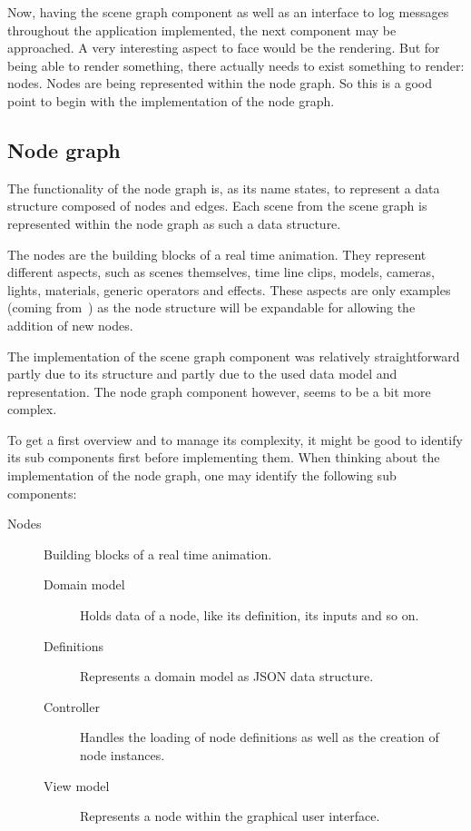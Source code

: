 \documentclass[
    a4paper,      %
    10pt,         %
    openright,    %
    notitlepage,  %
    parskip=half, %
]{scrreprt}       %
\theoremstyle{definition}                    %
\begin{document}
Now, having the scene graph component as well as an interface to log messages
throughout the application implemented, the next component may be approached. A
very interesting aspect to face would be the rendering. But for being able to
render something, there actually needs to exist something to render: nodes.
Nodes are being represented within the node graph. So this is a good point to
begin with the implementation of the node graph.

\subsection{Node graph}
\label{subsec:node-graph}

The functionality of the node graph is, as its name states, to represent a data
structure composed of nodes and edges. Each scene from the scene graph is
represented within the node graph as such a data structure.

The nodes are the building blocks of a real time animation. They represent
different aspects, such as scenes themselves, time line clips, models, cameras,
lights, materials, generic operators and effects. These aspects are only examples
(coming from~) as the node
structure will be expandable for allowing the addition of new nodes.

The implementation of the scene graph component was relatively straightforward
partly due to its structure and partly due to the used data model and
representation. The node graph component however, seems to be a bit more complex.

To get a first overview and to manage its complexity, it might be good to
identify its sub components first before implementing them.
When thinking about the implementation of the node graph, one may identify the
following sub components:

\begin{description}
\item[Nodes] Building blocks of a real time animation.
  \begin{description}
    \item[Domain model] Holds data of a node, like its definition, its inputs
                        and so on.
    \item[Definitions]  Represents a domain model as JSON data structure.
    \item[Controller]   Handles the loading of node definitions as well as the
                        creation of node instances.
    \item[View model]   Represents a node within the graphical user interface.
  \end{description}
\end{description}
\end{document}
